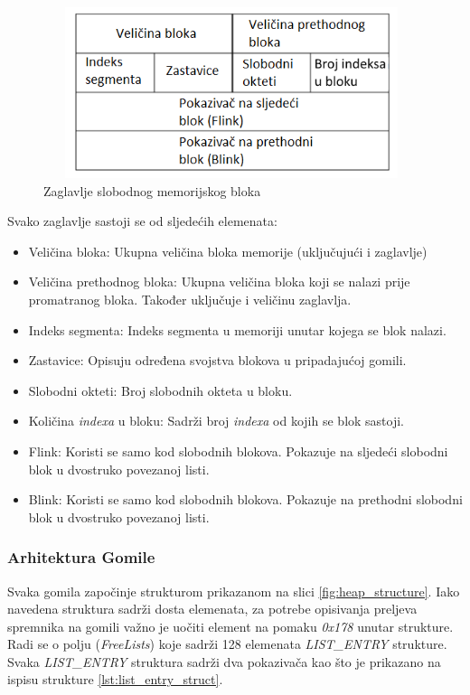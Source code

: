 \documentclass[times, utf8, diplomski, numeric]{fer}
\begin{document}
\begin{figure}[!ht]
\centering
\setlength\fboxsep{0pt}
\setlength\fboxrule{0.5pt}
\includegraphics[width=11cm, height=5cm]{slike/free_heap_block}
\caption{Zaglavlje slobodnog memorijskog bloka}
\label{fig:free_heap_block} 
\end{figure}

Svako zaglavlje sastoji se od sljedećih elemenata:

\begin{itemize}
\item Veličina bloka: Ukupna veličina bloka memorije (uključujući i zaglavlje)
\item Veličina prethodnog bloka: Ukupna veličina bloka koji se nalazi prije promatranog bloka. Također uključuje i veličinu zaglavlja.
\item Indeks segmenta: Indeks segmenta u memoriji unutar kojega se blok nalazi.
\item Zastavice: Opisuju određena svojstva blokova u pripadajućoj gomili.
\item Slobodni okteti: Broj slobodnih okteta u bloku.
\item Količina \emph{indexa} u bloku: Sadrži broj \emph{indexa} od kojih se blok sastoji. 
\item Flink: Koristi se samo kod slobodnih blokova. Pokazuje na sljedeći slobodni blok u dvostruko povezanoj listi.
\item Blink: Koristi se samo kod slobodnih blokova. Pokazuje na prethodni slobodni blok u dvostruko povezanoj listi.
\end{itemize}

\subsubsection{Arhitektura Gomile}

Svaka gomila započinje strukturom prikazanom na slici 
\ref{fig:heap_structure}. Iako navedena struktura sadrži dosta
elemenata, za potrebe opisivanja preljeva spremnika na gomili
važno je uočiti element na pomaku \emph{0x178} unutar strukture.
Radi se o polju (\emph{FreeLists}) koje sadrži 128 elemenata
\emph{LIST\_ENTRY} strukture. Svaka \emph{LIST\_ENTRY} struktura
sadrži dva pokazivača kao što je prikazano na ispisu strukture 
\ref{lst:list_entry_struct}.
\end{document}
